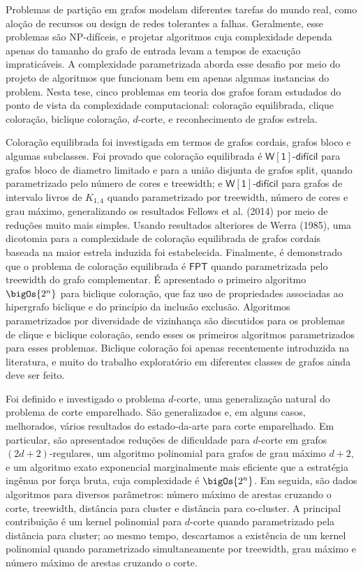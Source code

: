 Problemas de partição em grafos modelam diferentes tarefas do mundo real, como aloção de recursos ou design de redes tolerantes a falhas.
Geralmente, esse problemas são NP-difíceis, e projetar algoritmos cuja complexidade dependa apenas do tamanho do grafo de entrada levam a tempos de exacução impraticáveis.
A complexidade parametrizada aborda esse desafio por meio do projeto de algoritmos que funcionam bem em apenas algumas instancias do problem.
Nesta tese, cinco problemas em teoria dos grafos foram estudados do ponto de vista da complexidade computacional: coloração equilibrada, clique coloração, biclique coloração, $d$-corte, e reconhecimento de grafos estrela.

Coloração equilibrada foi investigada em termos de grafos cordais, grafos bloco e algumas subclasses.
Foi provado que coloração equilibrada  é
$\mathsf{W[1]\text{-}difícil}$ para grafos bloco de diametro limitado e para a união disjunta de grafos split, quando parametrizado pelo número de cores e treewidth; e
$\mathsf{W[1]\text{-}difícil}$ para grafos de intervalo livros de $K_{1,4}$ quando parametrizado por treewidth, número de cores e grau máximo, generalizando os resultados Fellows et al. (2014) por meio de reduções muito mais simples.
Usando resultados alteriores de Werra (1985), uma dicotomia para a complexidade de coloração equilibrada de grafos cordais baseada na maior estrela induzida foi estabelecida.
Finalmente, é demonstrado que o problema de coloração equilibrada é $\mathsf{FPT}$ quando parametrizada pelo treewidth do grafo complementar.
É apresentado o primeiro algoritmo $\bigOs{2^n}$ para biclique coloração, que faz uso de propriedades associadas ao hipergrafo biclique e do princípio da inclusão exclusão.
Algoritmos parametrizados por diversidade de vizinhança são discutidos para os problemas de clique e biclique coloração, sendo esses os primeiros algoritmos parametrizados para esses problemas.
Biclique coloração foi apenas recentemente introduzida na literatura, e muito do trabalho exploratório em diferentes classes de grafos ainda deve ser feito.

Foi definido e investigado o problema $d$-corte, uma generalização natural do problema de corte emparelhado.
São generalizados e, em alguns casos, melhorados, vários resultados do estado-da-arte para corte emparelhado.
Em particular, são apresentados reduções de \NP dificuldade para $d$-corte em grafos $(2d+2)$-regulares, um algoritmo polinomial para grafos de grau máximo $d + 2$, e um algoritmo exato exponencial marginalmente mais eficiente que a estratégia ingênua por força bruta, cuja complexidade é $\bigOs{2^n}$.
Em seguida, são dados algoritmos \FPT para diversos parâmetros: número máximo de arestas cruzando o corte, treewidth, distância para cluster e distância para co-cluster.
A principal contribuição é um kernel polinomial para $d$-corte quando parametrizado pela distância para cluster; ao mesmo tempo, descartamos a existência de um kernel polinomial quando parametrizado simultaneamente por treewidth, grau máximo e número máximo de arestas cruzando o corte.

